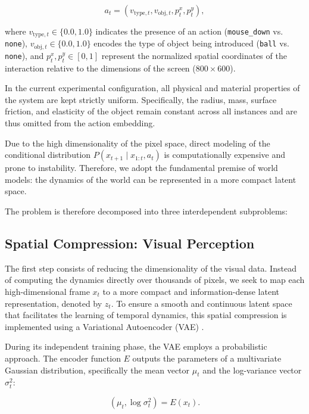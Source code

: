 \documentclass[conference]{IEEEtran}
\begin{document}
\begin{equation}
    a_t = (v_{{\text{type}},t}, v_{{\text{obj}},t}, p^x_t, p^y_t),
\end{equation}

where $v_{{\text{type}},t} \in \{0.0, 1.0\}$ indicates the presence of an action (\texttt{mouse\_down} vs. \texttt{none}), $v_{{\text{obj}},t} \in \{0.0, 1.0\}$ encodes the type of object being introduced (\texttt{ball} vs. \texttt{none}), and $p^x_t, p^y_t \in [0,1]$ represent the normalized spatial coordinates of the interaction relative to the dimensions of the screen ($800 \times 600$). 

In the current experimental configuration, all physical and material properties of the system are kept strictly uniform. Specifically, the radius, mass, surface friction, and elasticity of the object remain constant across all instances and are thus omitted from the action embedding.

Due to the high dimensionality of the pixel space, direct modeling of the conditional distribution $P(x_{t+1} \mid x_{1:t}, a_t)$ is computationally expensive and prone to instability. Therefore, we adopt the fundamental premise of world models: the dynamics of the world can be represented in a more compact latent space.

The problem is therefore decomposed into three interdependent subproblems:

\subsection{Spatial Compression: Visual Perception}

The first step consists of reducing the dimensionality of the visual data. Instead of computing the dynamics directly over thousands of pixels, we seek to map each high-dimensional frame $x_t$ to a more compact and information-dense latent representation, denoted by $z_t$. To ensure a smooth and continuous latent space that facilitates the learning of temporal dynamics, this spatial compression is implemented using a Variational Autoencoder (VAE) \cite{kingma2013autoencoding}.

During its independent training phase, the VAE employs a probabilistic approach. The encoder function $E$ outputs the parameters of a multivariate Gaussian distribution, specifically the mean vector $\mu_t$ and the log-variance vector $\sigma_t^2$:

\begin{equation}
    (\mu_t, \log \sigma_t^2) = E(x_t).
\end{equation}
\end{document}
